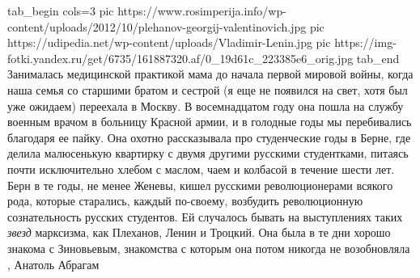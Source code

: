 \ifcmt
  tab_begin cols=3
     pic https://www.rosimperija.info/wp-content/uploads/2012/10/plehanov-georgij-valentinovich.jpg
		 pic https://udipedia.net/wp-content/uploads/Vladimir-Lenin.jpg
		 pic https://img-fotki.yandex.ru/get/6735/161887320.af/0_19d61c_223385e6_orig.jpg
  tab_end
\fi
Занималась медицинской практикой мама до начала первой мировой войны, когда
наша семья со старшими братом и сестрой (я еще не появился на свет, хотя был
уже ожидаем) переехала в Москву. В восемнадцатом году она пошла на службу
военным врачом в больницу Красной армии, и в голодные годы мы перебивались
благодаря ее пайку. Она охотно рассказывала про студенческие годы в Берне, где
делила малюсенькую квартирку с двумя другими русскими студентками, питаясь
почти исключительно хлебом с маслом, чаем и колбасой в течение шести лет. Берн
в те годы, не менее Женевы, кишел русскими революционерами всякого рода,
которые старались, каждый по-своему, возбудить революционную сознательность
русских студентов. Ей случалось бывать на выступлениях таких \emph{звезд} марксизма,
как Плеханов, Ленин и Троцкий. Она была в те дни хорошо знакома с Зиновьевым,
знакомства с которым она потом никогда не возобновляла
, Анатоль Абрагам
